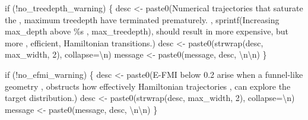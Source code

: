 \documentclass[
  letterpaper,
  DIV=11,
  numbers=noendperiod]{scrartcl}
\newenvironment{Shaded}{\begin{snugshade}}{\end{snugshade}}
\newcommand{\CharTok}[1]{\textcolor[rgb]{0.13,0.47,0.30}{#1}}
\newcommand{\ControlFlowTok}[1]{\textcolor[rgb]{0.00,0.23,0.31}{#1}}
\newcommand{\DecValTok}[1]{\textcolor[rgb]{0.68,0.00,0.00}{#1}}
\newcommand{\NormalTok}[1]{\textcolor[rgb]{0.00,0.23,0.31}{#1}}
\newcommand{\OperatorTok}[1]{\textcolor[rgb]{0.37,0.37,0.37}{#1}}
\newcommand{\SpecialCharTok}[1]{\textcolor[rgb]{0.37,0.37,0.37}{#1}}
\newcommand{\StringTok}[1]{\textcolor[rgb]{0.13,0.47,0.30}{#1}}
\begin{document}
\begin{Shaded}
\begin{Highlighting}[]
  \ControlFlowTok{if}\NormalTok{ (}\OperatorTok{!}\NormalTok{no\_treedepth\_warning) \{}
\NormalTok{    desc }\OperatorTok{\textless{}{-}}\NormalTok{ paste0(}\StringTok{\textquotesingle{}Numerical trajectories that saturate the \textquotesingle{}}\NormalTok{,}
                   \StringTok{\textquotesingle{}maximum treedepth have terminated prematurely.  \textquotesingle{}}\NormalTok{,}
\NormalTok{                   sprintf(}\StringTok{\textquotesingle{}Increasing max\_depth above }\SpecialCharTok{\%s}\StringTok{ \textquotesingle{}}\NormalTok{, max\_treedepth),}
                   \StringTok{\textquotesingle{}should result in more expensive, but more \textquotesingle{}}\NormalTok{,}
                   \StringTok{\textquotesingle{}efficient, Hamiltonian transitions.\textquotesingle{}}\NormalTok{)}
\NormalTok{    desc }\OperatorTok{\textless{}{-}}\NormalTok{ paste0(strwrap(desc, max\_width, }\DecValTok{2}\NormalTok{), collapse}\OperatorTok{=}\StringTok{\textquotesingle{}}\CharTok{\textbackslash{}n}\StringTok{\textquotesingle{}}\NormalTok{)}
\NormalTok{    message }\OperatorTok{\textless{}{-}}\NormalTok{ paste0(message, desc, }\StringTok{\textquotesingle{}}\CharTok{\textbackslash{}n\textbackslash{}n}\StringTok{\textquotesingle{}}\NormalTok{)}
\NormalTok{  \}}

  \ControlFlowTok{if}\NormalTok{ (}\OperatorTok{!}\NormalTok{no\_efmi\_warning) \{}
\NormalTok{    desc }\OperatorTok{\textless{}{-}}\NormalTok{ paste0(}\StringTok{\textquotesingle{}E{-}FMI below 0.2 arise when a funnel{-}like geometry \textquotesingle{}}\NormalTok{,}
                   \StringTok{\textquotesingle{}obstructs how effectively Hamiltonian trajectories \textquotesingle{}}\NormalTok{,}
                   \StringTok{\textquotesingle{}can explore the target distribution.\textquotesingle{}}\NormalTok{)}
\NormalTok{    desc }\OperatorTok{\textless{}{-}}\NormalTok{ paste0(strwrap(desc, max\_width, }\DecValTok{2}\NormalTok{), collapse}\OperatorTok{=}\StringTok{\textquotesingle{}}\CharTok{\textbackslash{}n}\StringTok{\textquotesingle{}}\NormalTok{)}
\NormalTok{    message }\OperatorTok{\textless{}{-}}\NormalTok{ paste0(message, desc, }\StringTok{\textquotesingle{}}\CharTok{\textbackslash{}n\textbackslash{}n}\StringTok{\textquotesingle{}}\NormalTok{)}
\NormalTok{  \}}


\end{Highlighting}
\end{Shaded}
\end{document}
